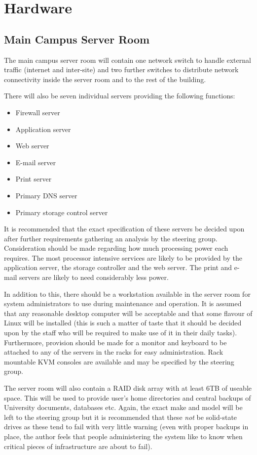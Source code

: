\documentclass[a4paper, twoside]{article}
\begin{document}
\section{Hardware}
\subsection{Main Campus Server Room}
The main campus server room will contain one network switch to handle external
traffic (internet and inter-site) and two further switches to distribute network
connectivity inside the server room and to the rest of the building.

There will also be seven individual servers providing the following functions:
\begin{itemize}
\item{Firewall server}
\item{Application server}
\item{Web server}
\item{E-mail server}
\item{Print server}
\item{Primary DNS server}
\item{Primary storage control server}
\end{itemize}
It is recommended that the exact specification of these servers be decided upon
after further requirements gathering an analysis by the steering group.
Consideration should be made regarding how much processing power each requires.
The most processor intensive services are likely to be provided by the
application server, the storage controller and the web server. The print and
e-mail servers are likely to need considerably less power.

In addition to this, there should be a workstation available in the server room
for system administrators to use during maintenance and operation. It is assumed
that any reasonable desktop computer will be acceptable and that some flavour of
Linux will be installed (this is such a matter of taste that it should be
decided upon by the staff who will be required to make use of it in their daily
tasks). Furthermore, provision should be made for a monitor and keyboard to be
attached to any of the servers in the racks for easy administration. Rack
mountable KVM consoles are available and may be specified by the steering group.

The server room will also contain a RAID disk array with at least 6TB of useable
space. This will be used to provide user's home directories and central backups
of University documents, databases etc. Again, the exact make and model will be
left to the steering group but it is recommended that these \emph{not} be
solid-state drives as these tend to fail with very little warning (even with
proper backups in place, the author feels that people administering the system
like to know when critical pieces of infrastructure are about to fail).
\end{document}
